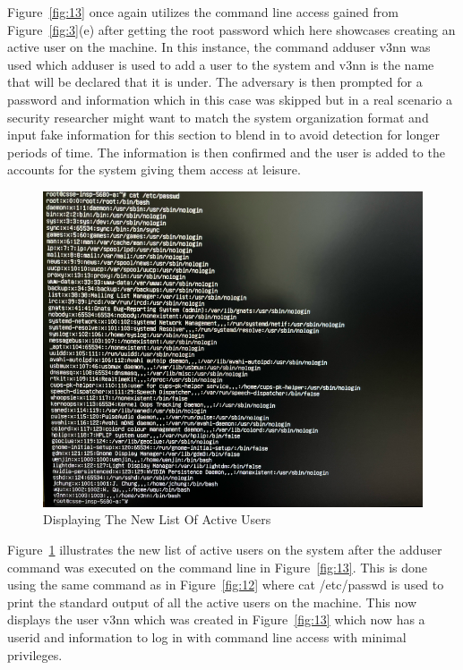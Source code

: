\documentclass[manuscript,acmsmall,anonymous,review,screen,nonacm=true, authorversion=true]{acmart}
\begin{document}
Figure~\ref{fig:13} once again utilizes the command line access gained from Figure~\ref{fig:3}(e) after
getting the root password which here showcases creating an active user on the machine. In
this instance, the command adduser v3nn was used which adduser is used to add a user to the
system and v3nn is the name that will be declared that it is under. The adversary is then
prompted for a password and information which in this case was skipped but in a real scenario a
security researcher might want to match the system organization format and input fake
information for this section to blend in to avoid detection for longer periods of time. The
information is then confirmed and the user is added to the accounts for the system giving them
access at leisure.
\begin{figure}
    \centering
    \includegraphics{pict/Picture14.png}
    \caption{Displaying The New List Of Active Users}
    \label{fig:14}
\end{figure}


Figure~\ref{fig:14} illustrates the new list of active users on the system after the adduser command
was executed on the command line in Figure~\ref{fig:13}. This is done using the same command as
in Figure~\ref{fig:12} where cat /etc/passwd is used to print the standard output of all the active users on
the machine. This now displays the user v3nn which was created in Figure~\ref{fig:13} which now
has a userid and information to log in with command line access with minimal privileges.
\end{document}
